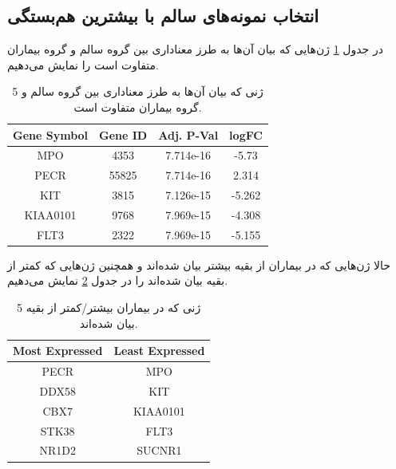 \documentclass{article}
\begin{document}
\subsection{انتخاب نمونه‌های سالم با بیشترین هم‌بستگی}
در جدول \ref{tab:genes-2} ژن‌هایی که بیان آن‌ها به طرز معناداری بین گروه سالم و گروه بیماران متفاوت است را نمایش می‌دهیم.

\begin{table}[h!]
	\begin{latin}
		\begin{center}
			\begin{tabular}{@{}cccc@{}}
				\toprule
				Gene Symbol & Gene ID & Adj. P-Val & logFC  \\ \midrule
				MPO      & 4353  & 7.714e-16 & -5.73  \\
				PECR     & 55825 & 7.714e-16 & 2.314  \\
				KIT      & 3815  & 7.126e-15 & -5.262 \\
				KIAA0101 & 9768  & 7.969e-15 & -4.308 \\
				FLT3     & 2322  & 7.969e-15 & -5.155 \\ \bottomrule
			\end{tabular}
		\end{center}
	\end{latin}
	\caption{5 ژنی که بیان آن‌ها به طرز معناداری بین گروه سالم و گروه بیماران متفاوت است.}
	\label{tab:genes-2}
\end{table}

حالا ژن‌هایی که در بیماران از بقیه بیشتر بیان شده‌اند و همچنین ژن‌هایی که کمتر از بقیه بیان شده‌اند را در جدول \ref{tab:up-down-2} نمایش می‌دهیم.

\begin{table}[h!]
	\begin{latin}
		\begin{center}
			\begin{tabular}{@{}cc@{}}
				\toprule
				Most Expressed & Least Expressed \\ \midrule
				PECR           & MPO             \\
				DDX58          & KIT            \\
				CBX7           & KIAA0101        \\
				STK38          & FLT3           \\
				NR1D2          & SUCNR1          \\ \bottomrule
			\end{tabular}
		\end{center}
	\end{latin}
	\caption{5 ژنی که در بیماران بیشتر/کمتر از بقیه بیان شده‌اند.}
	\label{tab:up-down-2}
\end{table}
\end{document}
